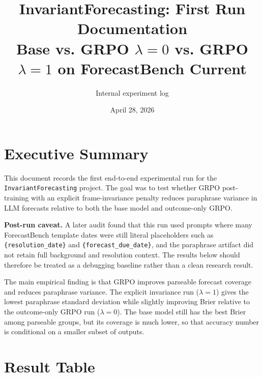 \documentclass[11pt]{article}
\title{\vspace{-1.0em}\textbf{InvariantForecasting: First Run Documentation}\\[-0.15em]
\large Base vs. GRPO $\lambda=0$ vs. GRPO $\lambda=1$ on ForecastBench Current}
\author{Internal experiment log}
\date{April 28, 2026}
\begin{document}
\maketitle
\vspace{-1.5em}

\section*{Executive Summary}

This document records the first end-to-end experimental run for the
\texttt{InvariantForecasting} project. The goal was to test whether GRPO
post-training with an explicit frame-invariance penalty reduces paraphrase
variance in LLM forecasts relative to both the base model and outcome-only GRPO.

\textbf{Post-run caveat.} A later audit found that this run used prompts where
many ForecastBench template dates were still literal placeholders such as
\texttt{\{resolution\_date\}} and \texttt{\{forecast\_due\_date\}}, and the
paraphrase artifact did not retain full background and resolution context. The
results below should therefore be treated as a debugging baseline rather than a
clean research result.

The main empirical finding is that GRPO improves parseable forecast coverage and
reduces paraphrase variance. The explicit invariance run ($\lambda=1$) gives the
lowest paraphrase standard deviation while slightly improving Brier relative to
the outcome-only GRPO run ($\lambda=0$). The base model still has the best Brier
among parseable groups, but its coverage is much lower, so that accuracy number
is conditional on a smaller subset of outputs.

\section*{Result Table}
\end{document}
